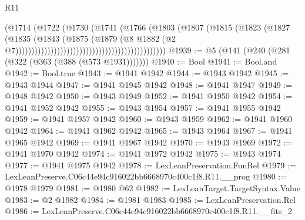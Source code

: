 \begin{lexlean}{R11}
\begin{coremodule}
                                                                  (@1714
                                                                    (@1722
                                                                      (@1730
                                                                        (@1741
                                                                          (@1766
                                                                            (@1803
                                                                              (@1807
                                                                                (@1815
                                                                                  (@1823
                                                                                    (@1827
                                                                                      (@1835
                                                                                        (@1843
                                                                                          (@1875
                                                                                            (@1879
                                                                                              (@8
                                                                                                @1882
                                                                                                (@2
                                                                                                  @7)))))))))))))))))))))))))))))))))))))))))))))))
@1939 := @5 (@141 (@240 (@281 (@322 (@363 (@388 (@573 @1931)))))))
@1940 := Bool
@1941 := Bool.and
@1942 := Bool.true
@1943 := @1941 @1942
@1944 := @1943 @1942
@1945 := @1943 @1944
@1947 := @1941 @1945 @1942
@1948 := @1941 @1947
@1949 := @1948 @1942
@1950 := @1943 @1949
@1952 := @1941 @1950 @1942
@1954 := @1941 @1952 @1942
@1955 := @1943 @1954
@1957 := @1941 @1955 @1942
@1959 := @1941 @1957 @1942
@1960 := @1943 @1959
@1962 := @1941 @1960 @1942
@1964 := @1941 @1962 @1942
@1965 := @1943 @1964
@1967 := @1941 @1965 @1942
@1969 := @1941 @1967 @1942
@1970 := @1943 @1969
@1972 := @1941 @1970 @1942
@1974 := @1941 @1972 @1942
@1975 := @1943 @1974
@1977 := @1941 @1975 @1942
@1978 := LexLeanPreservation.FunRel
@1979 := LexLeanPreserve.C06c44e94c916022bb6668970c400c1f8.R11.__prog
@1980 := @1978 @1979
@1981 := @1980 @62
@1982 := LexLeanTarget.TargetSyntax.Value
@1983 := @2 @1982
@1984 := @1981 @1983
@1985 := LexLeanPreservation.Rel
@1986 := LexLeanPreserve.C06c44e94c916022bb6668970c400c1f8.R11.__fits_2

\end{coremodule}
\end{lexlean}
